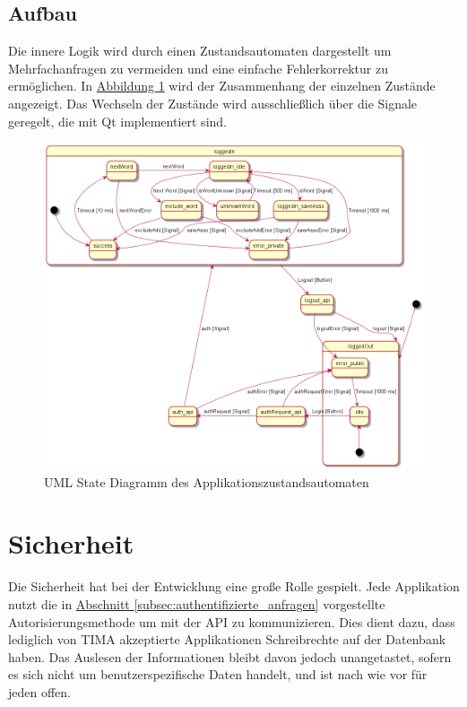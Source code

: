 \subsection{Aufbau}
Die innere Logik wird durch einen Zustandsautomaten dargestellt um
Mehrfachanfragen zu vermeiden und eine einfache Fehlerkorrektur zu ermöglichen.
In \hyperref[fig:uml_automata]{Abbildung \ref*{fig:uml_automata}} wird der Zusammenhang der einzelnen
Zustände angezeigt. Das Wechseln der Zustände wird ausschließlich über die
Signale geregelt, die mit Qt implementiert sind.
\begin{figure}[!h]
	\centering
	\includegraphics[width=\textwidth]{../UML/app_automata.png}
	\caption{UML State Diagramm des Applikationszustandsautomaten}
	\label{fig:uml_automata}
\end{figure}

\section{Sicherheit}
Die Sicherheit hat bei der Entwicklung eine große Rolle gespielt. Jede Applikation nutzt die in \hyperref[subsec:authentifizierte_anfragen]{Abschnitt \ref*{subsec:authentifizierte_anfragen}} vorgestellte Autorisierungsmethode um mit der API zu kommunizieren.  Dies dient dazu, dass lediglich von TIMA
akzeptierte Applikationen Schreibrechte auf der Datenbank haben. Das Auslesen
der Informationen bleibt davon jedoch unangetastet, sofern es sich nicht um benutzerspezifische Daten handelt, und ist nach wie vor für
jeden offen.
